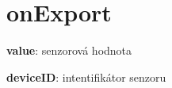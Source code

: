 \documentclass[thesis=M,czech]{FITthesis}[2012/06/26]
\begin{document}
\section{onExport}
\begin{description}
 \item \textbf{value}: senzorová hodnota
 \item  \textbf{deviceID}: intentifikátor senzoru
\end{description}


% 
% 
% 
% 
% 
\end{document}
